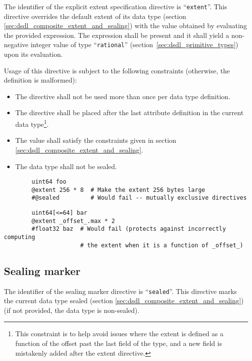 The identifier of the explicit extent specification directive is ``\verb|extent|''.
This directive overrides the default extent of its data type (section \ref{sec:dsdl_composite_extent_and_sealing})
with the value obtained by evaluating the provided expression.
The expression shall be present and it shall yield a non-negative integer value of type
``\verb|rational|'' (section~\ref{sec:dsdl_primitive_types}) upon its evaluation.

Usage of this directive is subject to the following constraints (otherwise, the definition is malformed):
\begin{itemize}
    \item The directive shall not be used more than once per data type definition.
    \item The directive shall be placed after the last attribute definition in the current data type\footnote{%
              This constraint is to help avoid issues where the extent is defined as a function of the offset past
              the last field of the type, and a new field is mistakenly added after the extent directive.
          }.
    \item The value shall satisfy the constraints given in section \ref{sec:dsdl_composite_extent_and_sealing}.
    \item The data type shall not be sealed.
\end{itemize}

\begin{remark}
    \begin{verbatim}
        uint64 foo
        @extent 256 * 8  # Make the extent 256 bytes large
        #@sealed         # Would fail -- mutually exclusive directives
    \end{verbatim}

    \begin{verbatim}
        uint64[<=64] bar
        @extent _offset_.max * 2
        #float32 baz  # Would fail (protects against incorrectly computing
                      # the extent when it is a function of _offset_)
    \end{verbatim}
\end{remark}

\subsection{Sealing marker}\label{sec:dsdl_directive_sealed}

The identifier of the sealing marker directive is ``\verb|sealed|''.
This directive marks the current data type sealed (section \ref{sec:dsdl_composite_extent_and_sealing})
(if not provided, the data type is non-sealed).

